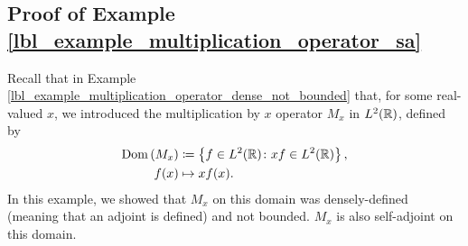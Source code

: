 \subsection{Proof of Example \eqref{lbl_example_multiplication_operator_sa}}\label{proof_lbl_example_multiplication_operator_sa}

\begin{example}
  Recall that in Example \eqref{lbl_example_multiplication_operator_dense_not_bounded} that, for some real-valued $x$, we introduced the multiplication by $x$ operator $M_x$ in $L^2(\mathbb{R})$, defined by
  \begin{align*}
    \operatorname{Dom}\left(M_x\right) &\coloneqq  \left\{f \in L^2(\mathbb{R}) \colon xf \in L^2(\mathbb{R})\right\}, \\
    f(x) &\mapsto xf(x).
  \end{align*}
  In this example, we showed that $M_x$ on this domain was densely-defined (meaning that an adjoint is defined) and not bounded. $M_x$ is also self-adjoint on this domain.
\end{example}

